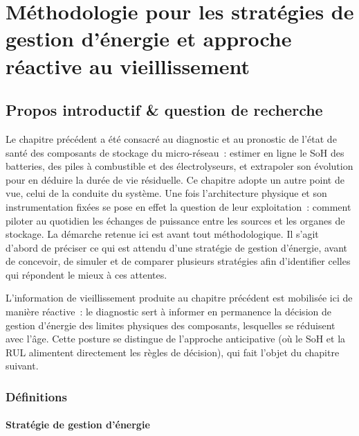 \chapter{Méthodologie pour les stratégies de gestion d'énergie et approche réactive au vieillissement}
\pagestyle{fancy}
\fancyhead[LE]{\textbf{\thepage}}
\fancyhead[RO]{\textbf{\thepage}}
\fancyhead[LO]{\textbf{\leftmark}}
\renewcommand{\sectionmark}[1]{\markboth{#1}{}}
\fancyfoot{}

\section{Propos introductif \& question de recherche}

Le chapitre précédent a été consacré au diagnostic et au pronostic de l'état de santé des composants de stockage du micro-réseau~: estimer en ligne le SoH des batteries, des piles à combustible et des électrolyseurs, et extrapoler son évolution pour en déduire la durée de vie résiduelle.
Ce chapitre adopte un autre point de vue, celui de la conduite du système.
Une fois l'architecture physique et son instrumentation fixées se pose en effet la question de leur exploitation~: comment piloter au quotidien les échanges de puissance entre les sources et les organes de stockage.
La démarche retenue ici est avant tout méthodologique.
Il s'agit d'abord de préciser ce qui est attendu d'une stratégie de gestion d'énergie, avant de concevoir, de simuler et de comparer plusieurs stratégies afin d'identifier celles qui répondent le mieux à ces attentes.

L'information de vieillissement produite au chapitre précédent est mobilisée ici de manière réactive~: le diagnostic sert à informer en permanence la décision de gestion d'énergie des limites physiques des composants, lesquelles se réduisent avec l'âge.
Cette posture se distingue de l'approche anticipative (où le SoH et la RUL alimentent directement les règles de décision), qui fait l'objet du chapitre suivant.

\subsection{Définitions}

\subsubsection{Stratégie de gestion d'énergie}

